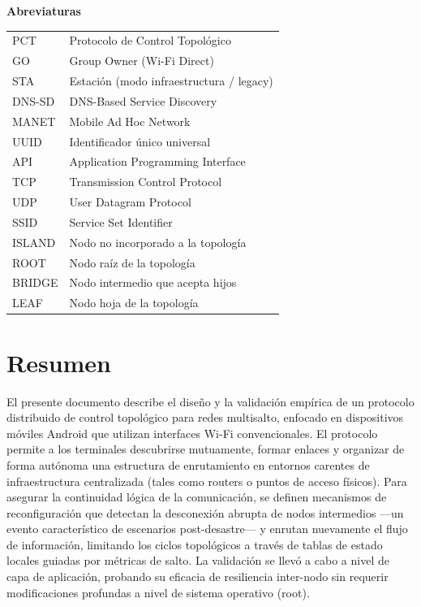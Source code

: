\documentclass[12pt,oneside]{scrreprt}
\begin{document}
\vspace{0.5cm}
\noindent\textbf{Abreviaturas}\par
\vspace{0.2cm}
\begin{tabular}{@{}ll@{}}
  PCT    & Protocolo de Control Topológico \\
  GO     & Group Owner (Wi-Fi Direct) \\
  STA    & Estación (modo infraestructura / legacy) \\
  DNS-SD & DNS-Based Service Discovery \\
  MANET  & Mobile Ad Hoc Network \\
  UUID   & Identificador único universal \\
  API    & Application Programming Interface \\
  TCP    & Transmission Control Protocol \\
  UDP    & User Datagram Protocol \\
  SSID   & Service Set Identifier \\
  ISLAND & Nodo no incorporado a la topología \\
  ROOT   & Nodo raíz de la topología \\
  BRIDGE & Nodo intermedio que acepta hijos \\
  LEAF   & Nodo hoja de la topología \\
\end{tabular}

\chapter*{Resumen}
El presente documento describe el diseño y la validación empírica de un protocolo distribuido de control topológico para redes multisalto, enfocado en dispositivos móviles Android que utilizan interfaces Wi-Fi convencionales. El protocolo permite a los terminales descubrirse mutuamente, formar enlaces y organizar de forma autónoma una estructura de enrutamiento en entornos carentes de infraestructura centralizada (tales como routers o puntos de acceso físicos). Para asegurar la continuidad lógica de la comunicación, se definen mecanismos de reconfiguración que detectan la desconexión abrupta de nodos intermedios ---un evento característico de escenarios post-desastre--- y enrutan nuevamente el flujo de información, limitando los ciclos topológicos a través de tablas de estado locales guiadas por métricas de salto. La validación se llevó a cabo a nivel de capa de aplicación, probando su eficacia de resiliencia inter-nodo sin requerir modificaciones profundas a nivel de sistema operativo (root).
\end{document}
